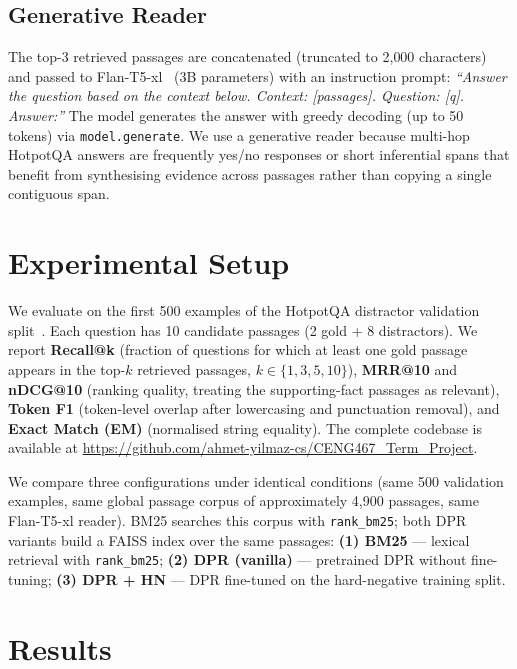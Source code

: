 \documentclass{llncs}
\begin{document}
\subsection{Generative Reader}

The top-3 retrieved passages are concatenated (truncated to 2{,}000 characters)
and passed to Flan-T5-xl~\cite{chung2022flant5} (3B parameters) with an
instruction prompt:
\textit{``Answer the question based on the context below. Context: [passages].
Question: [q]. Answer:''}
The model generates the answer with greedy decoding (up to 50 tokens) via
\texttt{model.generate}. We use a generative reader because multi-hop HotpotQA
answers are frequently yes/no responses or short inferential spans that benefit
from synthesising evidence across passages rather than copying a single
contiguous span.

\section{Experimental Setup}

We evaluate on the first 500 examples of the HotpotQA distractor validation
split~\cite{yang2018hotpotqa}. Each question has 10 candidate passages (2
gold + 8 distractors). We report \textbf{Recall@k} (fraction of questions for
which at least one gold passage appears in the top-$k$ retrieved passages,
$k \in \{1, 3, 5, 10\}$), \textbf{MRR@10} and \textbf{nDCG@10} (ranking
quality, treating the supporting-fact passages as relevant), \textbf{Token F1}
(token-level overlap after lowercasing and punctuation removal), and
\textbf{Exact Match (EM)} (normalised string equality). The complete codebase
is available at
\url{https://github.com/ahmet-yilmaz-cs/CENG467_Term_Project}.

We compare three configurations under identical conditions (same 500 validation
examples, same global passage corpus of approximately 4{,}900 passages, same
Flan-T5-xl reader). BM25 searches this corpus with \texttt{rank\_bm25}; both
DPR variants build a FAISS index over the same passages:
\textbf{(1) BM25} --- lexical retrieval with \texttt{rank\_bm25};
\textbf{(2) DPR (vanilla)} --- pretrained DPR without fine-tuning;
\textbf{(3) DPR + HN} --- DPR fine-tuned on the hard-negative training split.

\section{Results}
\end{document}
